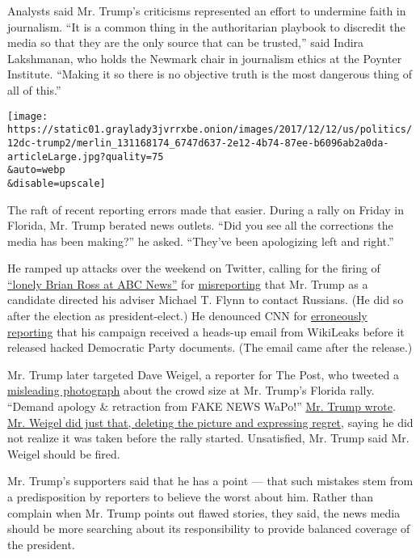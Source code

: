 Analysts said Mr. Trump's criticisms represented an effort to undermine
faith in journalism. ``It is a common thing in the authoritarian
playbook to discredit the media so that they are the only source that
can be trusted,'' said Indira Lakshmanan, who holds the Newmark chair in
journalism ethics at the Poynter Institute. ``Making it so there is no
objective truth is the most dangerous thing of all of this.''

\texttt{[image: https://static01.graylady3jvrrxbe.onion/images/2017/12/12/us/politics/12dc-trump2/merlin\_131168174\_6747d637-2e12-4b74-87ee-b6096ab2a0da-articleLarge.jpg?quality=75\\\&auto=webp\\\&disable=upscale]}

The raft of recent reporting errors made that easier. During a rally on
Friday in Florida, Mr. Trump berated news outlets. ``Did you see all the
corrections the media has been making?'' he asked. ``They've been
apologizing left and right.''

He ramped up attacks over the weekend on Twitter, calling for the firing
of
\href{https://twitter.com/realDonaldTrump/status/939480342779580416}{``lonely
Brian Ross at ABC News''} for
\href{https://www.nytimes3xbfgragh.onion/2017/12/02/us/brian-ross-suspended-abc.html}{misreporting}
that Mr. Trump as a candidate directed his adviser Michael T. Flynn to
contact Russians. (He did so after the election as president-elect.) He
denounced CNN for
\href{https://www.nytimes3xbfgragh.onion/2017/12/08/business/media/cnn-correction-donald-trump-jr.html}{erroneously
reporting} that his campaign received a heads-up email from WikiLeaks
before it released hacked Democratic Party documents. (The email came
after the release.)

Mr. Trump later targeted Dave Weigel, a reporter for The Post, who
tweeted a
\href{https://www.nytimes3xbfgragh.onion/2017/12/10/us/politics/trump-dave-weigel.html}{misleading
photograph} about the crowd size at Mr. Trump's Florida rally. ``Demand
apology \& retraction from FAKE NEWS WaPo!''
\href{https://twitter.com/realdonaldtrump/status/939616077356642304}{Mr.
Trump wrote}.
\href{https://twitter.com/daveweigel/status/939616810684514304}{Mr.
Weigel did just that, deleting the picture and expressing regret},
saying he did not realize it was taken before the rally started.
Unsatisfied, Mr. Trump said Mr. Weigel should be fired.

Mr. Trump's supporters said that he has a point --- that such mistakes
stem from a predisposition by reporters to believe the worst about him.
Rather than complain when Mr. Trump points out flawed stories, they
said, the news media should be more searching about its responsibility
to provide balanced coverage of the president.

